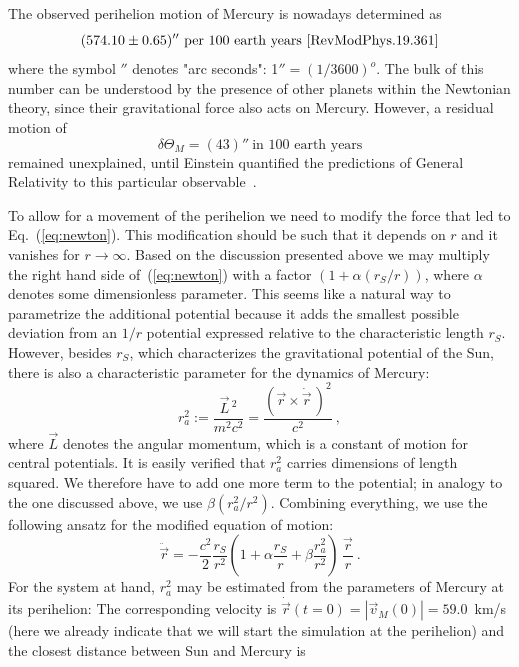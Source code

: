\documentclass[12pt,ngerman,american]{iopart}
\newcommand{\abs}[1]{\left\vert #1 \right\vert}
\begin{document}
The observed perihelion motion of Mercury is nowadays determined as
\[(574.10\pm 0.65)'' \ \mbox{per 100 earth years \cite{RevModPhys.19.361}}\]
where the symbol $''$ denotes "arc seconds": 1$''={(1/3600)}^o$. The bulk of this number
can be understood by the presence of other planets within the Newtonian theory, since
their gravitational force also acts on Mercury. However, a
residual motion of
\begin{equation}
\delta \Theta_M = (43)'' \ \mbox{in 100 earth years} \label{delT}
\end{equation}
remained unexplained, until Einstein quantified the predictions of General Relativity to this particular observable~\cite{Einstein}.

To allow for a movement of the perihelion we need to modify the force that led to Eq.~(\ref{eq:newton}).
This modification should be such that it depends on $r$ and it vanishes for $r\to \infty$.
Based on the discussion presented above we may multiply the right hand side of~(\ref{eq:newton}) with a factor
$(1+\alpha(r_S/r))$, where $\alpha$ denotes some dimensionless parameter.
This seems like a natural way to parametrize the additional potential because it adds the smallest possible deviation from an $1/r$ potential expressed relative to the characteristic length $r_S$.
However, besides $r_S$, which characterizes the gravitational potential of the Sun, there is also a characteristic parameter for the dynamics of Mercury:
\begin{equation}
r_a^2 := \frac{\vec L\,^2}{m^2c^2}= \frac{{(\vec r\times \dot{\vec r} \, )}^2}{c^2} \ , \label{a2def}
\end{equation}
where $\vec L$ denotes the angular momentum, which is a constant of motion for central potentials.
It is easily verified that $r_a^2$ carries dimensions of length squared.
We therefore have to add one more term to the potential; in analogy to the one discussed above, we use $\beta (r_a^2/r^2)$.
Combining everything, we use the following ansatz for the modified equation of motion:
\begin{equation}
\ddot{\vec r} = - \frac{c^2}{2}\frac{r_S}{r^2}\left(1+\alpha\frac{r_S}{r}+\beta\frac{r_a^2}{r^2}\right) \, \frac{\vec{r}}{r} \ .
\label{eq:newton_art}
\end{equation}
For the system at hand, $r_a^2$ may be estimated from the parameters of Mercury at its perihelion: The corresponding velocity is
 $\dot{\vec r}(t=0)=\abs{\vec v_M(0)} = 59.0$~km/s (here we already indicate that we will start the simulation at the perihelion) and the closest distance between Sun and Mercury is
\end{document}
